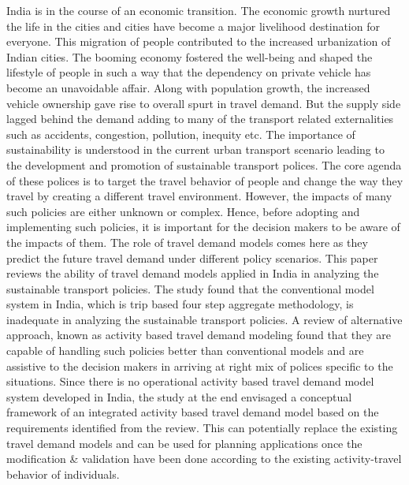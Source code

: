 India is in the course of an economic transition. The economic growth nurtured the life in the cities and cities have become a major livelihood destination for everyone. This migration of people contributed to the increased urbanization of Indian cities. The booming economy fostered the well-being and shaped the lifestyle of people in such a way that the dependency on private vehicle has become an unavoidable affair. Along with population growth, the increased vehicle ownership gave rise to overall spurt in travel demand. But the supply side lagged behind the demand adding to many of the transport related externalities such as accidents, congestion, pollution, inequity etc. The importance of sustainability is understood in the current urban transport scenario leading to the development and promotion of sustainable transport polices. The core agenda of these polices is to target the travel behavior of people and change the way they travel by creating a different travel environment. However, the impacts of many such policies are either unknown or complex. Hence, before adopting and implementing such policies, it is important for the decision makers to be aware of the impacts of them. The role of travel demand models comes here as they predict the future travel demand under different policy scenarios. This paper reviews the ability of travel demand models applied in India in analyzing the sustainable transport policies. The study found that the conventional model system in India, which is trip based four step aggregate methodology, is inadequate in analyzing the sustainable transport policies. A review of alternative approach, known as activity based travel demand modeling found that they are capable of handling such policies better than conventional models and are assistive to the decision makers in arriving at right mix of polices specific to the situations. Since there is no operational activity based travel demand model system developed in India, the study at the end envisaged a conceptual framework of an integrated activity based travel demand model based on the requirements identified from the review. This can potentially replace the existing travel demand models and can be used for planning applications once the modification & validation have been done according to the existing activity-travel behavior of individuals.
